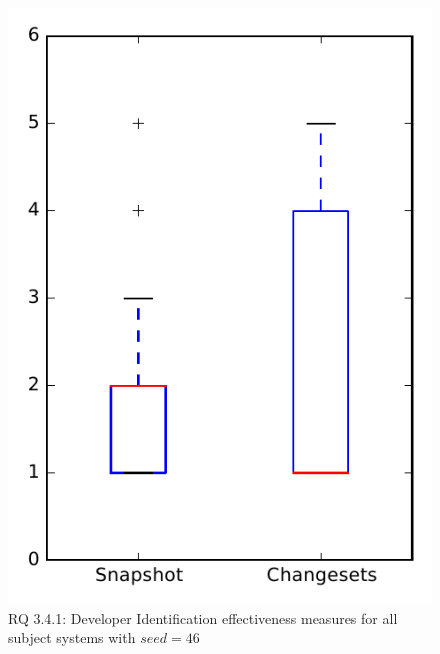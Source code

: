 
\begin{figure}
\centering
\includegraphics[height=0.4\textheight]{figures/dit_seed/rq1_overview_46}
\caption{RQ 3.4.1: Developer Identification effectiveness measures for all subject systems with $seed=46$}
\label{fig:dit_seed:rq1:overview}
\end{figure}

